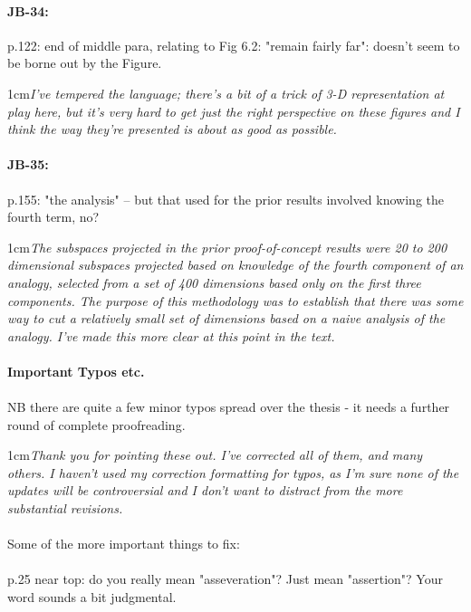 \documentclass[11pt,a4paper]{article}
\newcommand{\res}[1]{\vspace{0.25cm} \begin{adjustwidth}{1cm}{}\emph{#1}\end{adjustwidth}}
\begin{document}
\paragraph{JB-34:} p.122: end of middle para, relating to Fig 6.2: "remain fairly far": doesn't seem to be borne out by the Figure.

\res{I've tempered the language; there's a bit of a trick of 3-D representation at play here, but it's very hard to get just the right perspective on these figures and I think the way they're presented is about as good as possible.}

\paragraph{JB-35:} p.155: "the analysis" -- but that used for the prior results involved knowing the fourth term, no?

\res{The subspaces projected in the prior proof-of-concept results were 20 to 200 dimensional subspaces projected based on knowledge of the fourth component of an analogy, selected from a set of 400 dimensions based only on the first three components.  The purpose of this methodology was to establish that there was some way to cut a relatively small set of dimensions based on a naive analysis of the analogy.  I've made this more clear at this point in the text.}

\paragraph{Important Typos etc.}

\paragraph{}NB there are quite a few minor typos spread over the thesis - it needs a further round of complete proofreading.

\res{Thank you for pointing these out.  I've corrected all of them, and many others.  I haven't used my correction formatting for typos, as I'm sure none of the updates will be controversial and I don't want to distract from the more substantial revisions.}

\paragraph{} Some of the more important things to fix:

\paragraph{} p.25 near top: do you really mean "asseveration"? Just mean "assertion"? Your word sounds a bit judgmental.
\end{document}

